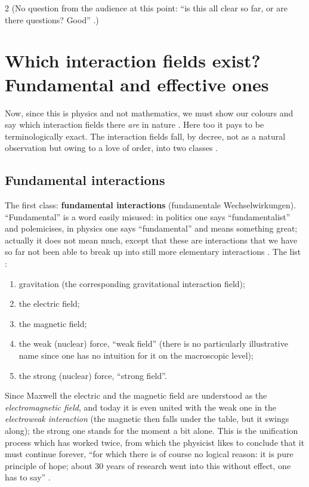 \begin{paracol}{2}
(No question from the audience at this point: ``is this all clear so far, or are there questions? Good'' .)

\section{Which interaction fields exist? Fundamental and effective ones}\label{sec:nd-which}

Now, since this is physics and not mathematics, we must show our colours and say which interaction fields there \emph{are} in nature . Here too it pays to be terminologically exact. The interaction fields fall, by decree, not as a natural observation but owing to a love of
order, into two classes .

\subsection{Fundamental interactions}\label{ssec:nd-fundamental}

The first class: \textbf{fundamental interactions} (fundamentale Wechselwirkungen). ``Fundamental'' is a word easily misused: in politics one says ``fundamentalist'' and polemicises, in physics one says ``fundamental'' and means something great; actually it does not mean much,
except that these are interactions that we have so far not been able to break up into still more elementary interactions . The list :
\begin{enumerate}
  \item gravitation (the corresponding gravitational interaction field);
  \item the electric field;
  \item the magnetic field;
  \item the weak (nuclear) force, ``weak field'' (there is no particularly illustrative name since one has no intuition for it on the macroscopic level);
  \item the strong (nuclear) force, ``strong field''.
\end{enumerate}
Since Maxwell the electric and the magnetic field are understood as the \emph{electromagnetic field}, and today it is even united with the weak one in the \emph{electroweak interaction} (the magnetic then falls under the table, but it swings along); the strong one stands for the moment
a bit alone. This is the unification process which has worked twice, from which the physicist likes to conclude that it must continue forever, ``for which there is of course no logical reason: it is pure principle of hope; about 30 years of research went into this without effect, one has to say''
.


\end{paracol}
